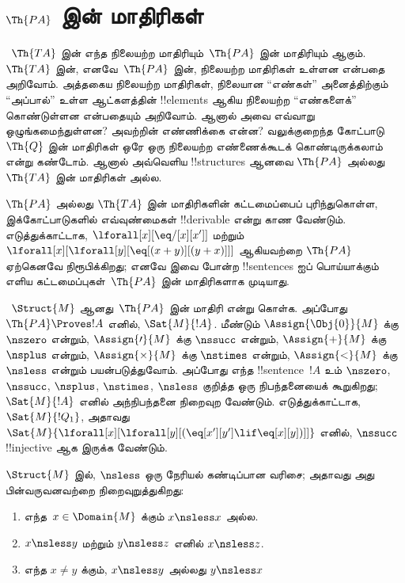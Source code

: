 \documentclass[../../../include/open-logic-section]{subfiles}
\begin{document}

\section{$\Th{PA}$ இன் மாதிரிகள்}

\begin{explain}
~$\Th{TA}$ இன் எந்த நிலையற்ற மாதிரியும்~$\Th{PA}$ இன் மாதிரியும்
ஆகும். ~$\Th{TA}$ இன், எனவே~$\Th{PA}$ இன், நிலையற்ற மாதிரிகள்
உள்ளன என்பதை அறிவோம். அத்தகைய நிலையற்ற மாதிரிகள், நிலையான
``எண்கள்'' அனைத்திற்கும் ``அப்பால்'' உள்ள ஆட்களத்தின் !!{element}s
ஆகிய நிலையற்ற ``எண்களைக்'' கொண்டுள்ளன என்பதையும் அறிவோம். ஆனால் அவை
எவ்வாறு ஒழுங்கமைந்துள்ளன? அவற்றின் எண்ணிக்கை என்ன? வலுக்குறைந்த
கோட்பாடு~$\Th{Q}$ இன் மாதிரிகள் ஒரே ஒரு நிலையற்ற எண்ணைக்கூடக்
கொண்டிருக்கலாம் என்று கண்டோம். ஆனால் அவ்வெளிய !!{structure}s ஆனவை
$\Th{PA}$ அல்லது $\Th{TA}$ இன் மாதிரிகள் அல்ல.

$\Th{PA}$ அல்லது $\Th{TA}$ இன் மாதிரிகளின் கட்டமைப்பைப் புரிந்துகொள்ள,
இக்கோட்பாடுகளில் எவ்வுண்மைகள் !!{derivable} என்று காண வேண்டும்.
எடுத்துக்காட்டாக, $\lforall[x][\eq/[x][x']]$ மற்றும்
$\lforall[x][\lforall[y][\eq[(x+y)][(y+x)]]]$ ஆகியவற்றை
$\Th{PA}$ ஏற்கெனவே நிரூபிக்கிறது; எனவே இவை போன்ற !!{sentence}s ஐப்
பொய்யாக்கும் எளிய கட்டமைப்புகள்~$\Th{PA}$ இன் மாதிரிகளாக முடியாது.

~$\Struct{M}$ ஆனது~$\Th{PA}$ இன் மாதிரி என்று கொள்க. அப்போது
$\Th{PA} \Proves
!A$ எனில், $\Sat{M}{!A}$. மீண்டும் $\Assign{\Obj{0}}{M}$ க்கு
$\nszero$ என்றும், $\Assign{\prime}{M}$ க்கு $\nssucc$ என்றும்,
$\Assign{+}{M}$ க்கு $\nsplus$ என்றும், $\Assign{\times}{M}$ க்கு
$\nstimes$ என்றும், $\Assign{<}{M}$ க்கு $\nsless$ என்றும்
பயன்படுத்துவோம். அப்போது எந்த !!{sentence}~$!A$ உம் $\nszero$,
$\nssucc$, $\nsplus$, $\nstimes$, $\nsless$ குறித்த ஒரு நிபந்தனையைக்
கூறுகிறது; $\Sat{M}{!A}$ எனில் அந்நிபந்தனை நிறைவுற வேண்டும்.
எடுத்துக்காட்டாக, $\Sat{M}{!Q_1}$, அதாவது
$\Sat{M}{\lforall[x][\lforall[y][(\eq[x'][y'] \lif \eq[x][y])]]}$
எனில், $\nssucc$ !!{injective} ஆக இருக்க வேண்டும்.
\end{explain}

\begin{prop}
$\Struct{M}$ இல், $\nsless$ ஒரு நேரியல் கண்டிப்பான வரிசை; அதாவது
அது பின்வருவனவற்றை நிறைவுறுத்துகிறது:
\begin{enumerate}
\item எந்த~$x \in \Domain{M}$ க்கும் $x \nsless x$ அல்ல.
\item $x \nsless y$ மற்றும் $y \nsless z$ எனில் $x \nsless z$.
\item எந்த $x \neq y$ க்கும், $x \nsless y$ அல்லது $y \nsless x$
\end{enumerate}
\end{prop}
\end{document}
